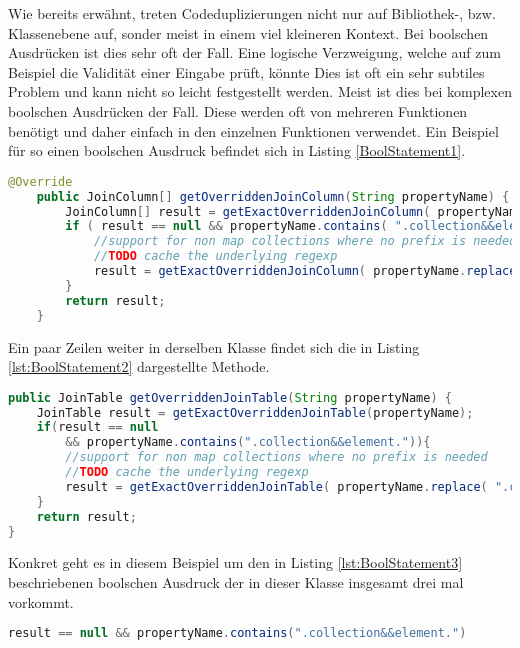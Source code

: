 \SuperPar Wie bereits erwähnt, treten Codeduplizierungen nicht nur auf Bibliothek-, bzw. Klassenebene auf, sonder meist in einem viel kleineren Kontext. Bei boolschen Ausdrücken ist dies sehr oft der Fall. Eine logische Verzweigung, welche auf zum Beispiel die Validität einer Eingabe prüft, könnte Dies ist oft ein sehr subtiles Problem und kann nicht so leicht festgestellt werden. Meist ist dies bei komplexen boolschen Ausdrücken der Fall. Diese werden oft von mehreren Funktionen benötigt und daher einfach in den einzelnen Funktionen verwendet. Ein Beispiel für so einen boolschen Ausdruck befindet sich in Listing \ref{BoolStatement1}.

\begin{lstlisting}[language=Java, caption=Komplexe boolsche Ausdrücke 1 Zeile 255 - 264, label=lst:BoolStatement1]
	@Override
	public JoinColumn[] getOverriddenJoinColumn(String propertyName) {
		JoinColumn[] result = getExactOverriddenJoinColumn( propertyName );
		if ( result == null && propertyName.contains( ".collection&&element." ) ) {
			//support for non map collections where no prefix is needed
			//TODO cache the underlying regexp
			result = getExactOverriddenJoinColumn( propertyName.replace( ".collection&&element.", "."  ) );
		}
		return result;
	}
\end{lstlisting}

\SuperPar Ein paar Zeilen weiter in derselben Klasse findet sich die in Listing \ref{lst:BoolStatement2} dargestellte Methode.

\begin{lstlisting}[language=Java, caption=Komplexe boolsche Ausdrücke 2 Zeile 305 - 313, label=lst:BoolStatement2]
public JoinTable getOverriddenJoinTable(String propertyName) {
	JoinTable result = getExactOverriddenJoinTable(propertyName);
	if(result == null 
		&& propertyName.contains(".collection&&element.")){
		//support for non map collections where no prefix is needed
		//TODO cache the underlying regexp
		result = getExactOverriddenJoinTable( propertyName.replace( ".collection&&element.", "."  ) );
	}
	return result;
}
\end{lstlisting}

\SuperPar Konkret geht es in diesem Beispiel um den in Listing \ref{lst:BoolStatement3} beschriebenen boolschen Ausdruck der in dieser Klasse insgesamt drei mal vorkommt.

\begin{lstlisting}[language=Java, caption=Boolscher Audruck, label=lst:BoolStatement3]
result == null && propertyName.contains(".collection&&element.")
\end{lstlisting}

